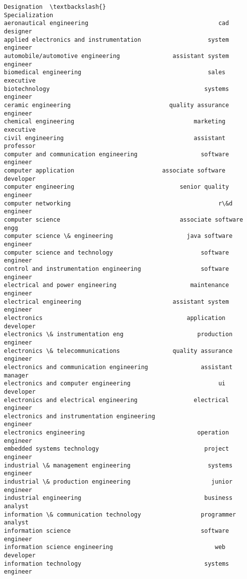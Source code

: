 \documentclass[11pt]{article}
\begin{document}
\begin{tcolorbox}[breakable, size=fbox, boxrule=.5pt, pad at break*=1mm, opacityfill=0]
\begin{Verbatim}[commandchars=\\\{\}]
                                                              Designation  \textbackslash{}
Specialization
aeronautical engineering                                     cad designer
applied electronics and instrumentation                   system engineer
automobile/automotive engineering               assistant system engineer
biomedical engineering                                    sales executive
biotechnology                                            systems engineer
ceramic engineering                            quality assurance engineer
chemical engineering                                  marketing executive
civil engineering                                     assistant professor
computer and communication engineering                  software engineer
computer application                         associate software developer
computer engineering                              senior quality engineer
computer networking                                          r\&d engineer
computer science                                  associate software engg
computer science \& engineering                     java software engineer
computer science and technology                         software engineer
control and instrumentation engineering                 software engineer
electrical and power engineering                     maintenance engineer
electrical engineering                          assistant system engineer
electronics                                         application developer
electronics \& instrumentation eng                     production engineer
electronics \& telecommunications               quality assurance engineer
electronics and communication engineering               assistant manager
electronics and computer engineering                         ui developer
electronics and electrical engineering                electrical engineer
electronics and instrumentation engineering                      engineer
electronics engineering                                operation engineer
embedded systems technology                              project engineer
industrial \& management engineering                      systems engineer
industrial \& production engineering                       junior engineer
industrial engineering                                   business analyst
information \& communication technology                 programmer analyst
information science                                     software engineer
information science engineering                             web developer
information technology                                   systems engineer

\end{Verbatim}
\end{tcolorbox}
\end{document}
